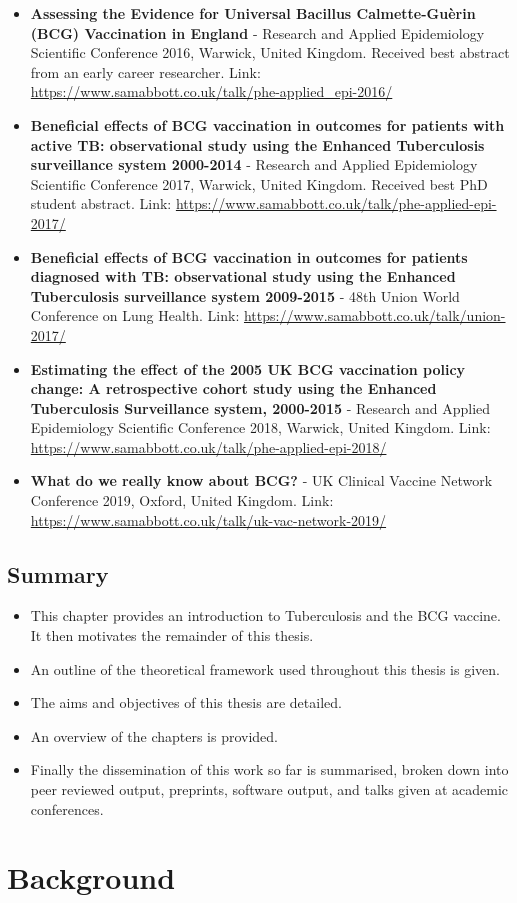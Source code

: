 \documentclass[11pt,twoside]{bristolthesis}
\providecommand{\tightlist}{%
  \setlength{\itemsep}{0pt}\setlength{\parskip}{0pt}}
\begin{document}
  \begin{itemize}
  \item
    \textbf{Assessing the Evidence for Universal Bacillus Calmette-Guèrin (BCG) Vaccination in England} - Research and Applied Epidemiology Scientific Conference 2016, Warwick, United Kingdom. Received best abstract from an early career researcher. Link: \url{https://www.samabbott.co.uk/talk/phe-applied_epi-2016/}
  \item
    \textbf{Beneficial effects of BCG vaccination in outcomes for patients with active TB: observational study using the Enhanced Tuberculosis surveillance system 2000-2014} - Research and Applied Epidemiology Scientific Conference 2017, Warwick, United Kingdom. Received best PhD student abstract. Link: \url{https://www.samabbott.co.uk/talk/phe-applied-epi-2017/}
  \item
    \textbf{Beneficial effects of BCG vaccination in outcomes for patients diagnosed with TB: observational study using the Enhanced Tuberculosis surveillance system 2009-2015} - 48th Union World Conference on Lung Health. Link: \url{https://www.samabbott.co.uk/talk/union-2017/}
  \item
    \textbf{Estimating the effect of the 2005 UK BCG vaccination policy change: A retrospective cohort study using the Enhanced Tuberculosis Surveillance system, 2000-2015} - Research and Applied Epidemiology Scientific Conference 2018, Warwick, United Kingdom. Link: \url{https://www.samabbott.co.uk/talk/phe-applied-epi-2018/}
  \item
    \textbf{What do we really know about BCG?} - UK Clinical Vaccine Network Conference 2019, Oxford, United Kingdom. Link: \url{https://www.samabbott.co.uk/talk/uk-vac-network-2019/}
  \end{itemize}
  \hypertarget{summary}{%
  \section{Summary}\label{summary}}
  \begin{itemize}
  \tightlist
  \item
    This chapter provides an introduction to Tuberculosis and the BCG vaccine. It then motivates the remainder of this thesis.
  \item
    An outline of the theoretical framework used throughout this thesis is given.
  \item
    The aims and objectives of this thesis are detailed.
  \item
    An overview of the chapters is provided.
  \item
    Finally the dissemination of this work so far is summarised, broken down into peer reviewed output, preprints, software output, and talks given at academic conferences.
  \end{itemize}
  \hypertarget{background}{%
  \chapter{Background}\label{background}}
  
\end{document}
